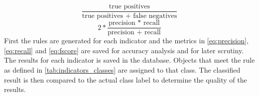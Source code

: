 \documentclass[authoryear,review,12pt,number]{elsarticle}
\begin{document}
\begin{equation}\label{eq:recall}
    \frac{\text{true positives}}{\text{true positives + false negatives}}
\end{equation}
\begin{equation}\label{eq:fscore}
    2 * \frac{\text{precision * recall}}{\text{precision + recall}}
\end{equation}
First the rules are generated for each indicator and the metrics in
\ref{eq:precision}, \ref{eq:recall} and \ref{eq:fscore} are saved for accuracy
analysis and for later scrutiny. The results for each indicator is saved in the
database. 
Objects that meet the rule as defined in \ref{tab:indicators_classes} are
assigned to that class. The classified result is then compared to the actual
class label to determine the quality of the results.



\end{document}
